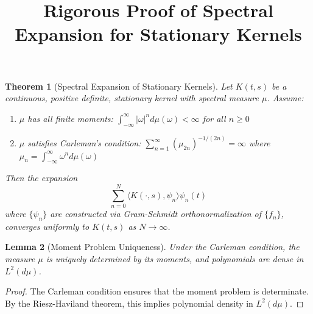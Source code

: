 \documentclass{article}
\newtheorem{theorem}{Theorem}
\newtheorem{lemma}[theorem]{Lemma}
\begin{document}
\title{Rigorous Proof of Spectral Expansion for Stationary Kernels}
\author{}
\maketitle

\begin{theorem}[Spectral Expansion of Stationary Kernels]
Let $K(t,s)$ be a continuous, positive definite, stationary kernel with spectral measure $\mu$. Assume:
\begin{enumerate}
    \item $\mu$ has all finite moments: $\int_{-\infty}^{\infty} |\omega|^n d\mu(\omega) < \infty$ for all $n \geq 0$
    \item $\mu$ satisfies Carleman's condition: $\sum_{n=1}^{\infty} (\mu_{2n})^{-1/(2n)} = \infty$ where $\mu_n = \int_{-\infty}^{\infty} \omega^n d\mu(\omega)$
\end{enumerate}
Then the expansion
\[ \sum_{n=0}^N \langle K(\cdot,s), \psi_n \rangle \psi_n(t) \]
where $\{\psi_n\}$ are constructed via Gram-Schmidt orthonormalization of $\{f_n\}$, converges uniformly to $K(t,s)$ as $N \to \infty$.
\end{theorem}

\begin{lemma}[Moment Problem Uniqueness]
Under the Carleman condition, the measure $\mu$ is uniquely determined by its moments, and polynomials are dense in $L^2(d\mu)$.
\end{lemma}

\begin{proof}
The Carleman condition ensures that the moment problem is determinate. By the Riesz-Haviland theorem, this implies polynomial density in $L^2(d\mu)$.
\end{proof}
\end{document}
